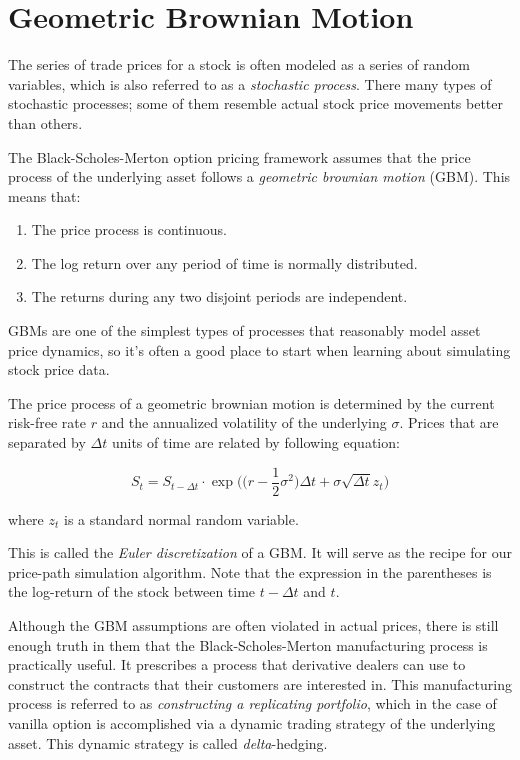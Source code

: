 \documentclass[
  letterpaper,
  DIV=11,
  numbers=noendperiod]{scrreprt}
\begin{document}
\hypertarget{geometric-brownian-motion}{%
\section{Geometric Brownian Motion}\label{geometric-brownian-motion}}

The series of trade prices for a stock is often modeled as a series of
random variables, which is also referred to as a \emph{stochastic
process}. There many types of stochastic processes; some of them
resemble actual stock price movements better than others.

The Black-Scholes-Merton option pricing framework assumes that the price
process of the underlying asset follows a \emph{geometric brownian
motion} (GBM). This means that:

\begin{enumerate}
\def\labelenumi{\arabic{enumi}.}
\item
  The price process is continuous.
\item
  The log return over any period of time is normally distributed.
\item
  The returns during any two disjoint periods are independent.
\end{enumerate}

GBMs are one of the simplest types of processes that reasonably model
asset price dynamics, so it's often a good place to start when learning
about simulating stock price data.

The price process of a geometric brownian motion is determined by the
current risk-free rate \(r\) and the annualized volatility of the
underlying \(\sigma\). Prices that are separated by \(\Delta t\) units
of time are related by following equation:

\[S_{t} =  S_{t - \Delta t} \cdot \exp\bigg(\bigg(r - \frac{1}{2}\sigma^2\bigg)\Delta t + \sigma \sqrt{\Delta t} z_{t}\bigg)\]

where \(z_{t}\) is a standard normal random variable.

This is called the \emph{Euler discretization} of a GBM. It will serve
as the recipe for our price-path simulation algorithm. Note that the
expression in the parentheses is the log-return of the stock between
time \(t - \Delta t\) and \(t\).

Although the GBM assumptions are often violated in actual prices, there
is still enough truth in them that the Black-Scholes-Merton
manufacturing process is practically useful. It prescribes a process
that derivative dealers can use to construct the contracts that their
customers are interested in. This manufacturing process is referred to
as \emph{constructing a replicating portfolio}, which in the case of
vanilla option is accomplished via a dynamic trading strategy of the
underlying asset. This dynamic strategy is called \emph{delta}-hedging.
\end{document}
